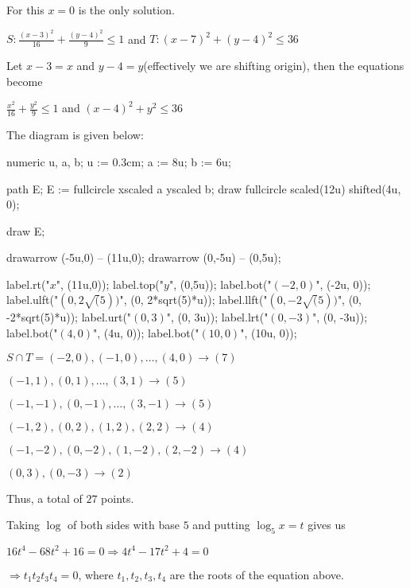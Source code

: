   For this $x = 0$ is the only solution.
\item $S: \frac{(x - 3)^2}{16} + \frac{(y - 4)^2}{9}\leq 1$ and $T: (x - 7)^2 + (y - 4)^2\leq 36$

  Let $x - 3 = x$ and $y - 4 = y$(effectively we are shifting origin), then the equations become

  $\frac{x^2}{16} + \frac{y^2}{9}\leq 1$ and $(x - 4)^2 + y^2\leq 36$

  The diagram is given below:

  \startplacefigure[location=force]
    \startMPcode
      numeric u, a, b;
      u := 0.3cm;        %
      a := 8u;         %
      b := 6u;         %

      path E;
      E := fullcircle xscaled a yscaled b;
      draw fullcircle scaled(12u) shifted(4u, 0);

      draw E;

      drawarrow (-5u,0) -- (11u,0);
      drawarrow (0,-5u) -- (0,5u);

      label.rt("$x$", (11u,0));
      label.top("$y$", (0,5u));
      label.bot("$(-2, 0)$", (-2u, 0));
      label.ulft("$(0, 2\sqrt(5))$", (0, 2*sqrt(5)*u));
      label.llft("$(0, -2\sqrt(5))$", (0, -2*sqrt(5)*u));
      label.urt("$(0, 3)$", (0, 3u));
      label.lrt("$(0, -3)$", (0, -3u));
      label.bot("$(4, 0)$", (4u, 0));
      label.bot("$(10, 0)$", (10u, 0));
    \stopMPcode
  \stopplacefigure

  $S\cap T = (-2, 0), (-1, 0), \ldots, (4, 0)\rightarrow (7)$

  $(-1, 1), (0, 1), \ldots, (3, 1) \rightarrow (5)$

  $(-1, -1), (0, -1), \ldots, (3, -1) \rightarrow (5)$

  $(-1, 2), (0, 2), (1, 2), (2, 2)\rightarrow (4)$

  $(-1, -2), (0, -2), (1, -2), (2, -2)\rightarrow (4)$

  $(0, 3), (0, -3) \rightarrow (2)$

  Thus, a total of $27$ points.
\item Taking $\log$ of both sides with base $5$ and putting $\log_5x = t$ gives us

  $16t^4 - 68t^2 + 16 = 0\Rightarrow 4t^4 - 17t^2 + 4 = 0$

  $\Rightarrow t_1t_2t_3t_4 = 0$, where $t_1, t_2, t_3, t_4$ are the roots of the equation above.

